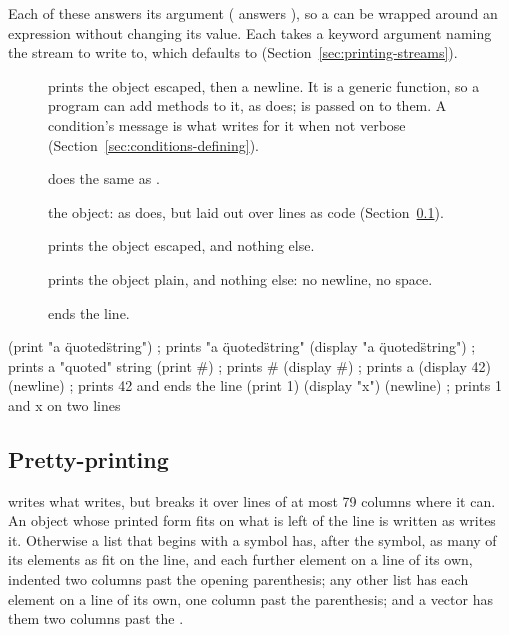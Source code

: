 Each of these answers its argument ( answers ),
so a  can be wrapped around an expression without changing
its value. Each takes a  keyword argument naming the
stream to write to, which defaults to 
(Section~\ref{sec:printing-streams}).

\begin{description}
\item[]
  prints the object escaped, then a newline. It is a generic function,
  so a program can add methods to it, as  does;
   is passed on to them. A condition's message is what
   writes for it when not verbose
  (Section~\ref{sec:conditions-defining}).
\item[]
  does the same as .
\item[]
   the object: as  does, but laid out
  over lines as code (Section~\ref{sec:printing-pp}).
\item[] prints
  the object escaped, and nothing else.
\item[]
  prints the object plain, and nothing else: no newline, no space.
\item[] ends the line.
\end{description}

\begin{dylan}
(print "a \"quoted\" string")     ; prints "a \"quoted\" string"
(display "a \"quoted\" string")   ; prints a "quoted" string
(print #\a)                       ; prints #\a
(display #\a)                     ; prints a
(display 42) (newline)            ; prints 42 and ends the line
(print 1) (display "x") (newline) ; prints 1 and x on two lines
\end{dylan}

\subsection{Pretty-printing}\label{sec:printing-pp}

 writes what  writes, but breaks it over lines of
at most 79 columns where it can. An object whose printed form fits on
what is left of the line is written as  writes it.
Otherwise a list that begins with a symbol has, after the symbol, as many
of its elements as fit on the line, and each further element on a line
of its own, indented two columns past the opening parenthesis; any other
list has each element on a line of its own, one column past the
parenthesis; and a vector has them two columns past the \code{\#}.

